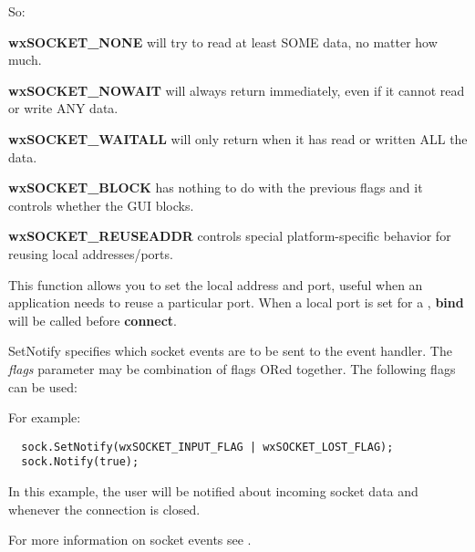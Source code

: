 So:

{\bf wxSOCKET\_NONE} will try to read at least SOME data, no matter how much.

{\bf wxSOCKET\_NOWAIT} will always return immediately, even if it cannot
read or write ANY data.

{\bf wxSOCKET\_WAITALL} will only return when it has read or written ALL
the data.

{\bf wxSOCKET\_BLOCK} has nothing to do with the previous flags and
it controls whether the GUI blocks.

{\bf wxSOCKET\_REUSEADDR} controls special platform-specific behavior for
reusing local addresses/ports.

%
%
\label{wxsocketbasesetlocal}


This function allows you to set the local address and port,
useful when an application needs to reuse a particular port. When
a local port is set for a ,
{\bf bind} will be called before {\bf connect}.

%
%
\label{wxsocketbasesetnotify}


SetNotify specifies which socket events are to be sent to the event handler.
The {\it flags} parameter may be combination of flags ORed together. The
following flags can be used:

\twocolwidtha{7cm}
\begin{twocollist}\itemsep=0pt
\end{twocollist}

For example:

\begin{verbatim}
  sock.SetNotify(wxSOCKET_INPUT_FLAG | wxSOCKET_LOST_FLAG);
  sock.Notify(true);
\end{verbatim}

In this example, the user will be notified about incoming socket data and
whenever the connection is closed.

For more information on socket events see .

